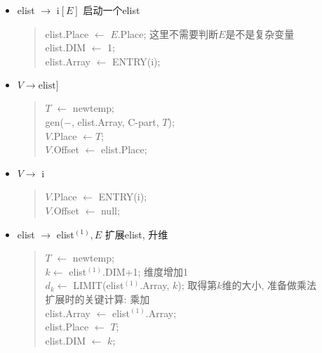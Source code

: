 \begin{itemize}
\begin{verse}
                            \end{verse}
                        \item elist $\to$ i$[E]$ \hfill 启动一个elist
                            \begin{verse}
                                elist.Place $\gets$ $E$.Place; \hfill 这里不需要判断$E$是不是复杂变量 \\
                                elist.DIM $\gets$ 1; \\
                                elist.Array $\gets$ ENTRY(i);
                            \end{verse}
                        \item $V\to \mathrm{elist}]$
                            \begin{verse}
                                $T$ $\gets$ newtemp; \\
                                gen($-$, elist.Array, C-part, $T$); \\
                                $V$.Place $\gets T$; \\
                                $V$.Offset $\gets$ elist.Place;
                            \end{verse}
                        \item $V\to$ i
                            \begin{verse}
                                $V$.Place $\gets$ ENTRY(i); \\
                                $V$.Offset $\gets$ null; 
                            \end{verse}
                        \item elist $\to$ elist$^{(1)}, E$ \hfill 扩展elist, 升维
                            \begin{verse}
                                $T$ $\gets$ newtemp; \\
                                $k \gets$ elist$^{(1)}$.DIM+1; \hfill 维度增加1 \\
                                $d_k \gets$ LIMIT(elist$^{(1)}$.Array, $k$); \hfill 取得第$k$维的大小, 准备做乘法 \\ 
                                 \hfill 扩展时的关键计算: 乘加 \\
                                elist.Array $\gets$ elist$^{(1)}$.Array; \\
                                elist.Place $\gets$ $T$; \\
                                elist.DIM $\gets$ $k$;
                            \end{verse}
                    \end{itemize}

